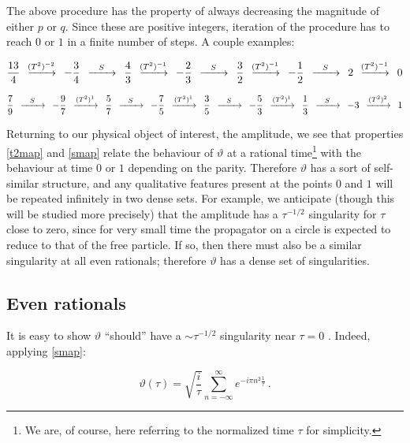 \documentclass{article}
\newcommand{\T}{\ensuremath{\vartheta}}
\newcommand{\sumZ}{\sum_{n=-\infty}^{\infty}}
\begin{document}
The above procedure has the property of always decreasing the magnitude of either $p$ or $q$. Since these are positive integers, iteration of the procedure has to reach $0$ or $1$ in a finite number of steps. A couple examples:

\newcommand{\sapp}{\,\;\ensuremath{\xrightarrow{\mathmakebox[2em]{S}}}\;\,}
\newcommand{\tapp}[1]{\,\;\xrightarrow{\mathmakebox[2em]{(T^2)^{#1}}}\;\,}

\begin{equation}
    \frac{13}{4} \tapp{-2} - \frac{3}{4} \sapp \frac{4}{3} \tapp{-1} - \frac{2}{3} \sapp \frac{3}{2} \tapp{-1} -\frac{1}{2} \sapp 2 \tapp{-1} 0
\end{equation}

\begin{equation}
    \frac{7}{9} \sapp - \frac{9}{7} \tapp{1} \frac{5}{7} \sapp -\frac{7}{5} \tapp{1} \frac{3}{5} \sapp - \frac{5}{3} \tapp{1} \frac{1}{3} \sapp -3 \tapp{2} 1
\end{equation}

Returning to our physical object of interest, the amplitude, we see that properties \eqref{t2map} and \eqref{smap} relate the behaviour of $\T$ at a rational time\footnote{We are, of course, here referring to the normalized time $\tau$ for simplicity.} with the behaviour at time $0$ or $1$ depending on the parity. Therefore $\T$ has a sort of self-similar structure, and any qualitative features present at the points $0$ and $1$ will be repeated infinitely in two dense sets. For example, we anticipate (though this will be studied more precisely) that the amplitude has a $\tau^{-1/2}$ singularity for $\tau$ close to zero, since for very small time the propagator on a circle is expected to reduce to that of the free particle. If so, then there must also be a similar singularity at all even rationals; therefore $\T$ has a dense set of singularities.


\subsection{Even rationals}\label{sec:evens}

\newcommand{\asympt}{(-i\tau)^{-1/2}}

It is easy to show $\T$ ``should'' have a $\sim \tau^{-1/2}$ singularity near $\tau = 0$ \cite{boxpdf}. Indeed, applying  \eqref{smap}:

\begin{equation}
    \vartheta(\tau) = \sqrt{\frac{i}{\tau}} \sumZ e^{-i\pi n^2 \frac{1}{\tau}}\,.
\end{equation}
\end{document}
